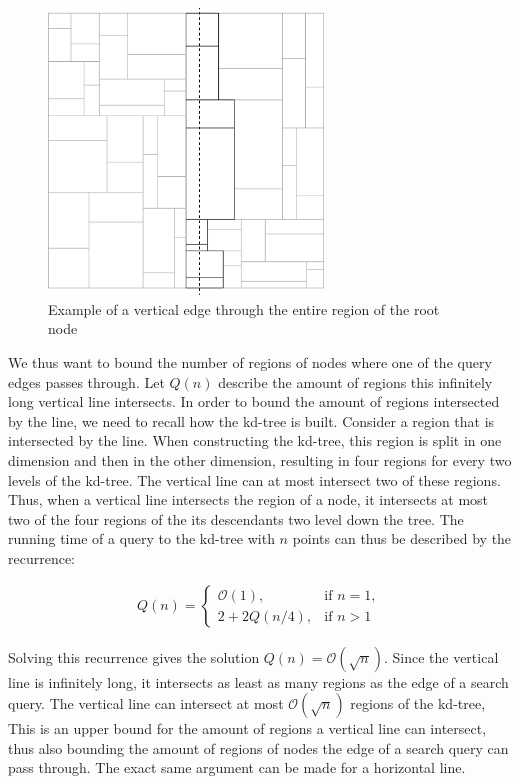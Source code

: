 \begin{figure}[h]
    \centering
    \includegraphics[width = 0.65\textwidth]{pictures/kd_bound2.png}
    \caption{Example of a vertical edge through the entire region of the root node}\label{fig:kd_bound}
\end{figure}

We thus want to bound the number of regions of nodes where one of the query edges passes through. Let $Q(n)$ describe the amount of regions this infinitely long vertical line intersects. In order to bound the amount of regions intersected by the line, we need to recall how the kd-tree is built. Consider a region that is intersected by the line. When constructing the kd-tree, this region is split in one dimension and then in the other dimension, resulting in four regions for every two levels of the kd-tree. The vertical line can at most intersect two of these regions. Thus, when a vertical line intersects the region of a node, it intersects at most two of the four regions of the its descendants two level down the tree. The running time of a query to the kd-tree with $n$ points can thus be described by the recurrence:

\begin{align*}
  Q(n) = \begin{cases}
    \mathcal{O}(1), & \text{if } n = 1,\\
    2 + 2Q(n/4), & \text{if } n > 1
  \end{cases}
\end{align*}

Solving this recurrence gives the solution $Q(n) = \mathcal{O}(\sqrt{n})$. Since the vertical line is infinitely long, it intersects as least as many regions as the edge of a search query. The vertical line can intersect at most $\mathcal{O}(\sqrt{n})$ regions of the kd-tree, This is an upper bound for the amount of regions a vertical line can intersect, thus also bounding the amount of regions of nodes the edge of a search query can pass through. The exact same argument can be made for a horizontal line.


